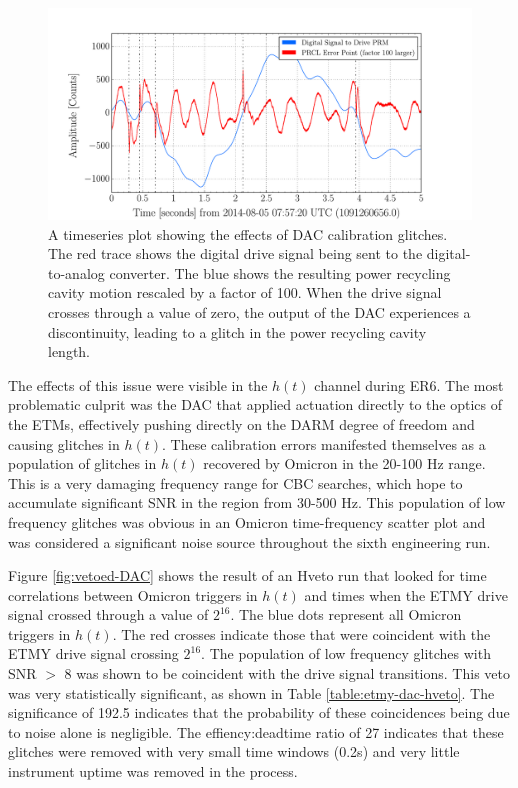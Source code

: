 \begin{figure}[ht!]%
\includegraphics[width=\textwidth]{figures/detchar/PRCL-DAC-glitch}
\caption[DAC glitches in PRCL]{A timeseries plot showing the effects of %
         DAC calibration glitches. The red trace shows the digital drive %
         signal being sent to the digital-to-analog converter. The blue %
         shows the resulting power recycling cavity motion rescaled by a %
         factor of 100. When the drive signal crosses %
         through a value of zero, the output of the DAC experiences a %
         discontinuity, leading to a glitch in the power recycling cavity %
         length.}
\label{fig:DAC-glitch}
\end{figure}

The effects of this issue were visible in the $h(t)$ channel during ER6. 
The most problematic culprit was the DAC that applied actuation directly 
to the optics of the ETMs, effectively pushing directly on the DARM degree 
of freedom and causing glitches in $h(t)$. These calibration errors manifested 
themselves as a population of glitches in $h(t)$ recovered by Omicron in the 
20-100 Hz range. This is a very damaging frequency range for CBC searches, 
which hope to accumulate significant SNR in the region from 30-500 Hz.  
This population of low frequency glitches was obvious in an Omicron 
time-frequency scatter plot and was considered a significant noise source 
throughout the sixth engineering run.

Figure \ref{fig:vetoed-DAC} shows the result of an Hveto run that looked 
for time correlations between Omicron triggers in $h(t)$ and times when 
the ETMY drive signal crossed through a value of $2^{16}$. The blue dots 
represent all Omicron triggers in $h(t)$. The red crosses indicate those 
that were coincident with the ETMY drive signal crossing $2^16$. The 
population of low frequency glitches with SNR $>$ 8 was shown to be 
coincident with the drive signal transitions. This veto 
was very statistically significant, as shown in Table \ref{table:etmy-dac-hveto}. 
The significance 
of 192.5 indicates that the probability of these coincidences being due 
to noise alone is negligible. The effiency:deadtime ratio of 27 indicates 
that these glitches were removed with very small time windows (0.2s) 
and very little instrument uptime was removed in the process.

